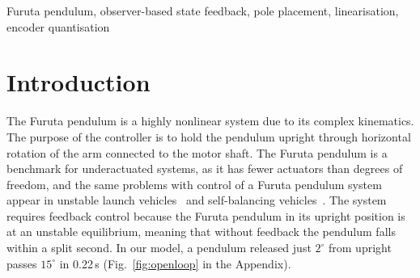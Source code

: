 \begin{abstract}
\begin{rw}
The Furuta pendulum is a small under-actuated laboratory system whose upright position is an unstable equilibrium. In this paper we test how far a linear controller can stabilise such a highly nonlinear system. A nonlinear Euler--Lagrange model is linearised about upright to give a four-state model with one voltage input and two encoder measurements. Pole placement with integral action on the arm angle is combined with a discrete-time state observer, which estimates the unmeasured velocities at 1\,kHz. The design is validated on the nonlinear model with saturation, encoder quantisation, disturbances and parameter error. It recovers from a 10\textdegree{} tilt in 0.97\,s using at most 6.6\,V and tracks a 30\textdegree{} arm step with 1.4\% overshoot and 1.38\,s settling. Gain margins are $-4.6$/$+16.6$\,dB with a phase margin of 36\textdegree{}. A firm tap reaches 14.6\textdegree{}, just inside the 15\textdegree{} limit. Monte Carlo tests show that the observer reduces robustness to parameter error, and that this depends strongly on observer speed.
\end{rw}
\end{abstract}

\begin{IEEEkeywords}
Furuta pendulum, observer-based state feedback, pole placement, linearisation, encoder quantisation
\end{IEEEkeywords}

\section{Introduction}
The Furuta pendulum is a highly nonlinear system due to its complex kinematics. The purpose of the controller is to hold the pendulum upright through horizontal rotation of the arm connected to the motor shaft. The Furuta pendulum is a benchmark for underactuated systems, as it has fewer actuators than degrees of freedom, and the same problems with control of a Furuta pendulum system appear in unstable launch vehicles~\cite{pei2018} and self-balancing vehicles~\cite{pujol2014}. The system requires feedback control because the Furuta pendulum in its upright position is at an unstable equilibrium, meaning that without feedback the pendulum falls within a split second. In our model, a pendulum released just $2^\circ$ from upright passes $15^\circ$ in 0.22\,s (Fig.~\ref{fig:openloop} in the Appendix).

